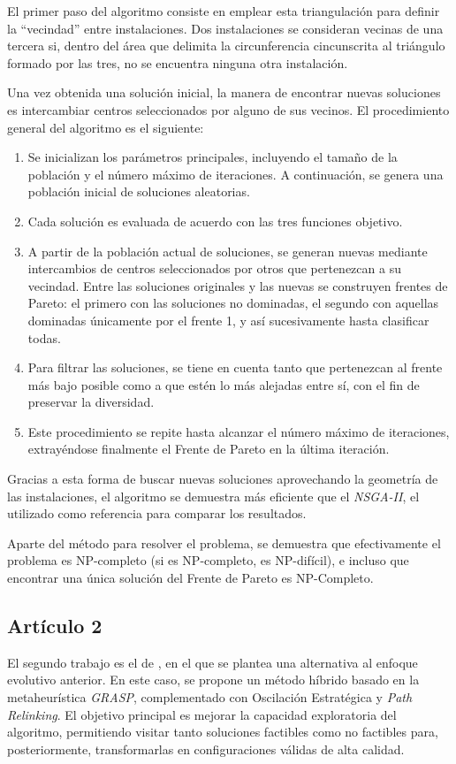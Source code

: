 \documentclass[12pt,a4paper]{book}
\begin{document}
El primer paso del algoritmo consiste en emplear esta triangulación para definir la ``vecindad'' entre instalaciones. Dos instalaciones se consideran vecinas de una tercera si, 
dentro del área que delimita la circunferencia cincunscrita al triángulo formado por las tres, no se encuentra ninguna otra instalación. 

Una vez obtenida una solución inicial, la manera de encontrar nuevas soluciones es intercambiar centros seleccionados por alguno de sus vecinos. El procedimiento general del algoritmo es el siguiente:

\begin{enumerate}
    \item Se inicializan los parámetros principales, incluyendo el tamaño de la población y el número máximo de iteraciones. A continuación, se genera una población inicial de soluciones aleatorias.
    \item Cada solución es evaluada de acuerdo con las tres funciones objetivo.
    \item A partir de la población actual de soluciones, se generan nuevas mediante intercambios de centros seleccionados por otros que pertenezcan a su vecindad. Entre las soluciones originales y las nuevas se construyen frentes
    de Pareto: el primero con las soluciones no dominadas, el segundo con aquellas dominadas únicamente por el frente 1, y así sucesivamente hasta clasificar todas. 
    \item Para filtrar las soluciones, se tiene en cuenta tanto que pertenezcan al frente más bajo posible como a que estén lo más alejadas entre sí, con el fin de preservar la diversidad. 
    \item Este procedimiento se repite hasta alcanzar el número máximo de iteraciones,  extrayéndose finalmente el Frente de Pareto en la última iteración.
\end{enumerate}
Gracias a esta forma de buscar nuevas soluciones aprovechando la geometría de las instalaciones, el algoritmo se demuestra más eficiente que el \textit{NSGA-II}, el utilizado como 
referencia para comparar los resultados. 

Aparte del método para resolver el problema, se demuestra que efectivamente el problema es NP-completo (si es NP-completo, es NP-difícil), e incluso que encontrar una única
solución del Frente de Pareto es NP-Completo.

\subsection{Artículo 2}
El segundo trabajo es el de \cite{k-Balanced_2}, en el que se plantea una alternativa al enfoque evolutivo anterior. En este caso, se propone un método híbrido basado en la metaheurística \textit{GRASP}, complementado con Oscilación Estratégica y \textit{Path Relinking}. El objetivo principal es mejorar la capacidad exploratoria del algoritmo, permitiendo visitar tanto soluciones factibles como no factibles para, posteriormente, transformarlas en configuraciones válidas de alta calidad.
\end{document}
